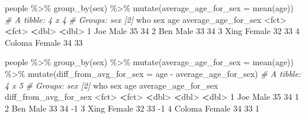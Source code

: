 \documentclass[
]{book}
\newenvironment{Shaded}{\begin{snugshade}}{\end{snugshade}}
\newcommand{\AttributeTok}[1]{\textcolor[rgb]{0.77,0.63,0.00}{#1}}
\newcommand{\CommentTok}[1]{\textcolor[rgb]{0.56,0.35,0.01}{\textit{#1}}}
\newcommand{\DecValTok}[1]{\textcolor[rgb]{0.00,0.00,0.81}{#1}}
\newcommand{\ErrorTok}[1]{\textcolor[rgb]{0.64,0.00,0.00}{\textbf{#1}}}
\newcommand{\FunctionTok}[1]{\textcolor[rgb]{0.00,0.00,0.00}{#1}}
\newcommand{\NormalTok}[1]{#1}
\newcommand{\SpecialCharTok}[1]{\textcolor[rgb]{0.00,0.00,0.00}{#1}}
\begin{document}
\begin{Shaded}
\begin{Highlighting}[]
\NormalTok{people }\SpecialCharTok{\%\textgreater{}\%} 
  \FunctionTok{group\_by}\NormalTok{(sex) }\SpecialCharTok{\%\textgreater{}\%}
  \FunctionTok{mutate}\NormalTok{(}\AttributeTok{average\_age\_for\_sex =} \FunctionTok{mean}\NormalTok{(age)) }
\CommentTok{\# A tibble: 4 x 4}
\CommentTok{\# Groups:   sex [2]}
\NormalTok{  who    sex      age average\_age\_for\_sex}
  \SpecialCharTok{\textless{}}\NormalTok{fct}\SpecialCharTok{\textgreater{}}  \ErrorTok{\textless{}}\NormalTok{fct}\SpecialCharTok{\textgreater{}}  \ErrorTok{\textless{}}\NormalTok{dbl}\SpecialCharTok{\textgreater{}}               \ErrorTok{\textless{}}\NormalTok{dbl}\SpecialCharTok{\textgreater{}}
\DecValTok{1}\NormalTok{ Joe    Male      }\DecValTok{35}                  \DecValTok{34}
\DecValTok{2}\NormalTok{ Ben    Male      }\DecValTok{33}                  \DecValTok{34}
\DecValTok{3}\NormalTok{ Xing   Female    }\DecValTok{32}                  \DecValTok{33}
\DecValTok{4}\NormalTok{ Coloma Female    }\DecValTok{34}                  \DecValTok{33}

\NormalTok{people }\SpecialCharTok{\%\textgreater{}\%} 
  \FunctionTok{group\_by}\NormalTok{(sex) }\SpecialCharTok{\%\textgreater{}\%}
  \FunctionTok{mutate}\NormalTok{(}\AttributeTok{average\_age\_for\_sex =} \FunctionTok{mean}\NormalTok{(age)) }\SpecialCharTok{\%\textgreater{}\%}
  \FunctionTok{mutate}\NormalTok{(}\AttributeTok{diff\_from\_avg\_for\_sex =}\NormalTok{ age }\SpecialCharTok{{-}}\NormalTok{ average\_age\_for\_sex)}
\CommentTok{\# A tibble: 4 x 5}
\CommentTok{\# Groups:   sex [2]}
\NormalTok{  who    sex      age average\_age\_for\_sex diff\_from\_avg\_for\_sex}
  \SpecialCharTok{\textless{}}\NormalTok{fct}\SpecialCharTok{\textgreater{}}  \ErrorTok{\textless{}}\NormalTok{fct}\SpecialCharTok{\textgreater{}}  \ErrorTok{\textless{}}\NormalTok{dbl}\SpecialCharTok{\textgreater{}}               \ErrorTok{\textless{}}\NormalTok{dbl}\SpecialCharTok{\textgreater{}}                 \ErrorTok{\textless{}}\NormalTok{dbl}\SpecialCharTok{\textgreater{}}
\DecValTok{1}\NormalTok{ Joe    Male      }\DecValTok{35}                  \DecValTok{34}                     \DecValTok{1}
\DecValTok{2}\NormalTok{ Ben    Male      }\DecValTok{33}                  \DecValTok{34}                    \SpecialCharTok{{-}}\DecValTok{1}
\DecValTok{3}\NormalTok{ Xing   Female    }\DecValTok{32}                  \DecValTok{33}                    \SpecialCharTok{{-}}\DecValTok{1}
\DecValTok{4}\NormalTok{ Coloma Female    }\DecValTok{34}                  \DecValTok{33}                     \DecValTok{1}
\end{Highlighting}
\end{Shaded}
\end{document}
